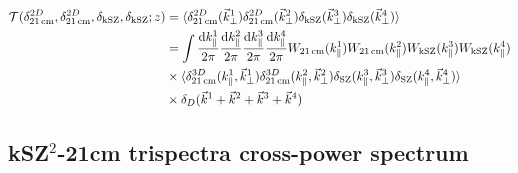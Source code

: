 \begin{equation}
\begin{split}
\mathcal{T}(\delta^{2D}_{\rm 21\,cm}, \delta^{2D}_{\rm 21\,cm}, \delta_{\rm kSZ}, \delta_{\rm kSZ}; z) &=
\langle \delta^{2D}_{\rm 21\,cm}(\vec{k}^1_{\perp})  \delta^{2D}_{\rm 21\,cm}(\vec{k}^2_{\perp})  \delta_{\rm kSZ}(\vec{k}^3_{\perp})\delta_{\rm kSZ}(\vec{k}^4_{\perp}) \rangle \\
&=
\int \frac{{\rm d}k^1_{\parallel}}{2\pi} \frac{{\rm d}k^2_{\parallel}}{2\pi} \frac{{\rm d}k^3_{\parallel}}{2\pi} \frac{{\rm d}k^4_{\parallel}}{2\pi}
W_{\rm 21\,cm}(k^1_{\parallel}) W_{\rm 21\,cm}(k^2_{\parallel}) W_{\rm kSZ}(k^3_{\parallel}) W_{\rm kSZ}(k^4_{\parallel}) \\
&
\times \langle \delta^{3D}_{\rm 21\,cm}(k^1_{\parallel}, \vec{k}^1_{\perp}) \delta^{3D}_{\rm 21\,cm}(k^2_{\parallel}, \vec{k}^2_{\perp}) \delta_{\rm SZ}(k^3_{\parallel}, \vec{k}^3_{\perp})  \delta_{\rm SZ}(k^4_{\parallel}, \vec{k}^4_{\perp}) \rangle \\
&
\times \delta_D(\vec{k}^1 + \vec{k}^2 + \vec{k}^3 + \vec{k}^4)
\end{split}
\label{eq:overall_trispec}
\end{equation}




\subsection{kSZ$^2$-21cm trispectra cross-power spectrum}

